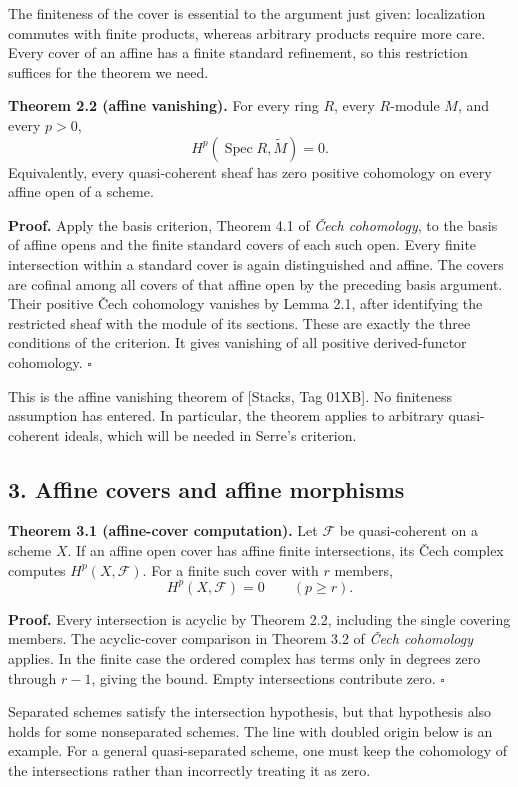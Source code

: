 \documentclass[11pt]{article}
\begin{document}
The finiteness of the cover is essential to the argument just given:
localization commutes with finite products, whereas arbitrary products
require more care. Every cover of an affine has a finite standard
refinement, so this restriction suffices for the theorem we need.

\textbf{Theorem 2.2 (affine vanishing).} For every ring \(R\), every
\(R\)-module \(M\), and every \(p>0\), \[
H^p(\operatorname{Spec}R,\widetilde M)=0.
\] Equivalently, every quasi-coherent sheaf has zero positive cohomology
on every affine open of a scheme.

\textbf{Proof.} Apply the basis criterion, Theorem 4.1 of \emph{Čech
cohomology}, to the basis of affine opens and the finite standard covers
of each such open. Every finite intersection within a standard cover is
again distinguished and affine. The covers are cofinal among all covers
of that affine open by the preceding basis argument. Their positive Čech
cohomology vanishes by Lemma 2.1, after identifying the restricted sheaf
with the module of its sections. These are exactly the three conditions
of the criterion. It gives vanishing of all positive derived-functor
cohomology. \(\square\)

This is the affine vanishing theorem of {[}Stacks, Tag 01XB{]}. No
finiteness assumption has entered. In particular, the theorem applies to
arbitrary quasi-coherent ideals, which will be needed in Serre's
criterion.

\subsection{3. Affine covers and affine
morphisms}\label{affine-covers-and-affine-morphisms}

\textbf{Theorem 3.1 (affine-cover computation).} Let \(\mathcal F\) be
quasi-coherent on a scheme \(X\). If an affine open cover has affine
finite intersections, its Čech complex computes \(H^p(X,\mathcal F)\).
For a finite such cover with \(r\) members, \[
H^p(X,\mathcal F)=0\qquad(p\ge r).
\]

\textbf{Proof.} Every intersection is acyclic by Theorem 2.2, including
the single covering members. The acyclic-cover comparison in Theorem 3.2
of \emph{Čech cohomology} applies. In the finite case the ordered
complex has terms only in degrees zero through \(r-1\), giving the
bound. Empty intersections contribute zero. \(\square\)

Separated schemes satisfy the intersection hypothesis, but that
hypothesis also holds for some nonseparated schemes. The line with
doubled origin below is an example. For a general quasi-separated
scheme, one must keep the cohomology of the intersections rather than
incorrectly treating it as zero.
\end{document}
